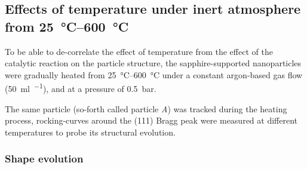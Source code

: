 \begin{table}[!htb]
\centering
{}
\caption{
    Example of algorithm chain used in BCDI for the phase retrieval.
    The support corresponds to the volume of the particle in real space.
}
\label{tab:ReconstructionProcess}
\end{table}

\subsection{Effects of temperature under inert atmosphere from \qtyrange{25}{600}{\degreeCelsius}}\label{sec:TempRampBCDI}

To be able to de-correlate the effect of temperature from the effect of the catalytic reaction on the particle structure, the sapphire-supported nanoparticles were gradually heated from \qtyrange{25}{600}{\degreeCelsius} under a constant argon-based gas flow (\qty{50}{\ml\per\min}), and at a pressure of \qty{0.5}{\bar}.

The same particle (so-forth called particle \textit{A}) was tracked during the heating process, rocking-curves around the (111) Bragg peak were measured at different temperatures to probe its structural evolution.

\subsubsection{Shape evolution}

